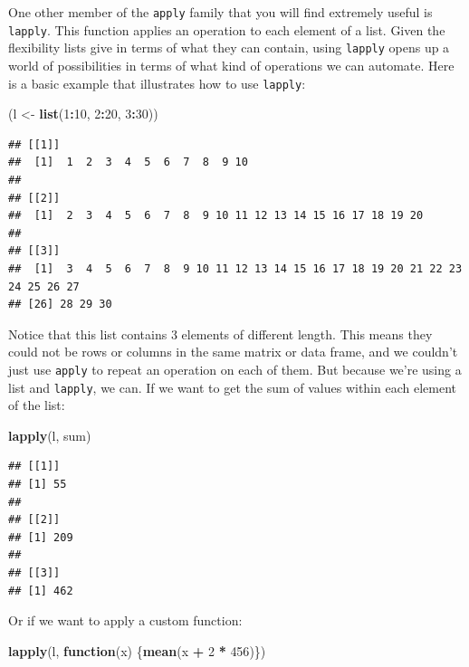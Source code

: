\documentclass[
]{book}
\newenvironment{Shaded}{\begin{snugshade}}{\end{snugshade}}
\newcommand{\ControlFlowTok}[1]{\textcolor[rgb]{0.13,0.29,0.53}{\textbf{#1}}}
\newcommand{\DecValTok}[1]{\textcolor[rgb]{0.00,0.00,0.81}{#1}}
\newcommand{\FunctionTok}[1]{\textcolor[rgb]{0.13,0.29,0.53}{\textbf{#1}}}
\newcommand{\NormalTok}[1]{#1}
\newcommand{\OtherTok}[1]{\textcolor[rgb]{0.56,0.35,0.01}{#1}}
\newcommand{\SpecialCharTok}[1]{\textcolor[rgb]{0.81,0.36,0.00}{\textbf{#1}}}
\begin{document}
One other member of the \texttt{apply} family that you will find extremely useful is
\texttt{lapply}. This function applies an operation to each element of a list. Given
the flexibility lists give in terms of what they can contain, using \texttt{lapply}
opens up a world of possibilities in terms of what kind of operations we can
automate. Here is a basic example that illustrates how to use \texttt{lapply}:

\begin{Shaded}
\begin{Highlighting}[]
\NormalTok{(l }\OtherTok{\textless{}{-}} \FunctionTok{list}\NormalTok{(}\DecValTok{1}\SpecialCharTok{:}\DecValTok{10}\NormalTok{, }\DecValTok{2}\SpecialCharTok{:}\DecValTok{20}\NormalTok{, }\DecValTok{3}\SpecialCharTok{:}\DecValTok{30}\NormalTok{))}
\end{Highlighting}
\end{Shaded}

\begin{verbatim}
## [[1]]
##  [1]  1  2  3  4  5  6  7  8  9 10
## 
## [[2]]
##  [1]  2  3  4  5  6  7  8  9 10 11 12 13 14 15 16 17 18 19 20
## 
## [[3]]
##  [1]  3  4  5  6  7  8  9 10 11 12 13 14 15 16 17 18 19 20 21 22 23 24 25 26 27
## [26] 28 29 30
\end{verbatim}

Notice that this list contains 3 elements of different length. This means they
could not be rows or columns in the same matrix or data frame, and we couldn't
just use \texttt{apply} to repeat an operation on each of them. But because we're using
a list and \texttt{lapply}, we can. If we want to get the sum of values within each
element of the list:

\begin{Shaded}
\begin{Highlighting}[]
\FunctionTok{lapply}\NormalTok{(l, sum)}
\end{Highlighting}
\end{Shaded}

\begin{verbatim}
## [[1]]
## [1] 55
## 
## [[2]]
## [1] 209
## 
## [[3]]
## [1] 462
\end{verbatim}

Or if we want to apply a custom function:

\begin{Shaded}
\begin{Highlighting}[]
\FunctionTok{lapply}\NormalTok{(l, }\ControlFlowTok{function}\NormalTok{(x) \{}\FunctionTok{mean}\NormalTok{(x }\SpecialCharTok{+} \DecValTok{2} \SpecialCharTok{*} \DecValTok{456}\NormalTok{)\})}
\end{Highlighting}
\end{Shaded}
\end{document}
